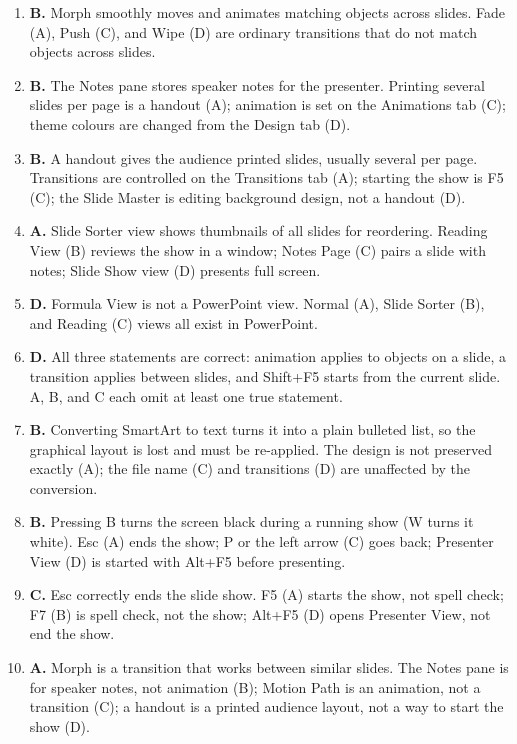 \documentclass[11pt]{article}
\begin{document}
\begin{enumerate}[label=\textbf{Q\arabic*.}, leftmargin=*]
  between slides, not on an object.
\item \textbf{B.} Morph smoothly moves and animates matching objects across
  slides. Fade (A), Push (C), and Wipe (D) are ordinary transitions that do not
  match objects across slides.
\item \textbf{B.} The Notes pane stores speaker notes for the presenter.
  Printing several slides per page is a handout (A); animation is set on the
  Animations tab (C); theme colours are changed from the Design tab (D).
\item \textbf{B.} A handout gives the audience printed slides, usually several
  per page. Transitions are controlled on the Transitions tab (A); starting the
  show is F5 (C); the Slide Master is editing background design, not a handout
  (D).
\item \textbf{A.} Slide Sorter view shows thumbnails of all slides for
  reordering. Reading View (B) reviews the show in a window; Notes Page (C)
  pairs a slide with notes; Slide Show view (D) presents full screen.
\item \textbf{D.} Formula View is not a PowerPoint view. Normal (A), Slide
  Sorter (B), and Reading (C) views all exist in PowerPoint.
\item \textbf{D.} All three statements are correct: animation applies to objects
  on a slide, a transition applies between slides, and Shift+F5 starts from the
  current slide. A, B, and C each omit at least one true statement.
\item \textbf{B.} Converting SmartArt to text turns it into a plain bulleted
  list, so the graphical layout is lost and must be re-applied. The design is
  not preserved exactly (A); the file name (C) and transitions (D) are
  unaffected by the conversion.
\item \textbf{B.} Pressing B turns the screen black during a running show
  (W turns it white). Esc (A) ends the show; P or the left arrow (C) goes
  back; Presenter View (D) is started with Alt+F5 before presenting.
\item \textbf{C.} Esc correctly ends the slide show. F5 (A) starts the show,
  not spell check; F7 (B) is spell check, not the show; Alt+F5 (D) opens
  Presenter View, not end the show.
\item \textbf{A.} Morph is a transition that works between similar slides. The
  Notes pane is for speaker notes, not animation (B); Motion Path is an
  animation, not a transition (C); a handout is a printed audience layout, not
  a way to start the show (D).


\end{enumerate}
\end{document}
